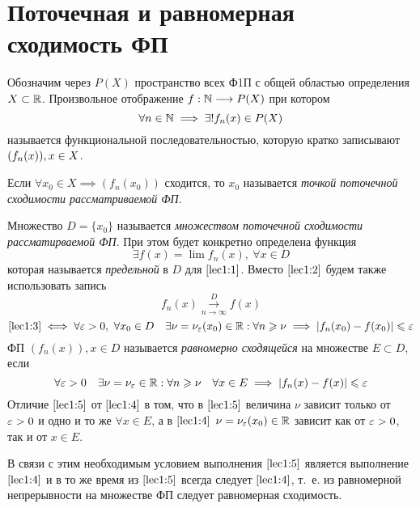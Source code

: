 \documentclass[../../main.tex]{subfiles}
\begin{document}
\section{Поточечная и равномерная сходимость ФП}
Обозначим через $P(X)$ пространство всех Ф1П 
с общей областью определения $X \subset \mathbb{R}$.
Произвольное отображение $f: \mathbb{N} \longrightarrow P(X)$ при котором 
\begin{equation}
\label{lec1:1}
\forall n \in \mathbb{N} \implies \exists! f_n(x) \in P(X)
\end{equation}
называется функциональной последовательностью, 
которую кратко записывают $(f_n(x)),\\ x\in X$.

Если $\forall x_0 \in X \implies (f_n(x_0))$ сходится, то $x_0$ называется
\emph{точкой поточечной сходимости рассматриваемой ФП}.

Множество $D = \{x_0\}$ называется \emph{множеством поточечной сходимости
рассматирваемой ФП}.
При этом будет конкретно определена функция 
\begin{equation}
\label{lec1:2}
\exists f(x) = \lim f_n(x),\ \forall x \in D
\end{equation}
которая называется \emph{предельной} в $D$ для $\eqref{lec1:1}$.
Вместо $\eqref{lec1:2}$ будем также использовать запись 
\begin{equation}
\label{lec1:3}
f_n(x) \overset{D}{\underset{n \to \infty}\longrightarrow} f(x)
\end{equation}
\begin{equation}
\label{lec1:4}
\eqref{lec1:3} \iff \forall \varepsilon > 0,\ \forall x_0 \in D \quad 
\exists \nu = \nu_\varepsilon(x_0) \in \mathbb{R} : \forall n \geqslant \nu \implies
|f_n(x_0) - f(x_0)| \leqslant \varepsilon
\end{equation}
ФП $(f_n(x)), x \in D$ называется \emph{равномерно сходящейся} 
на множестве $E \subset D$, если 
\begin{equation}
\label{lec1:5}
\forall \varepsilon > 0 \quad
\exists \nu = \nu_\varepsilon \in \mathbb{R} : 
\forall n \geqslant \nu \quad
\forall x \in E \implies 
|f_n(x) - f(x)| \leqslant \varepsilon
\end{equation}
Отличие $\eqref{lec1:5}$ от $\eqref{lec1:4}$ в том, что  в $\eqref{lec1:5}$
величина $\nu$ зависит только от $\varepsilon > 0$ и одно и то же $\forall x \in E$,
а в $\eqref{lec1:4}$ $\nu = \nu_\varepsilon(x_0) \in \mathbb{R}$ зависит как от $\varepsilon > 0$,
так и от $x \in E$.

В связи с этим необходимым условием выполнения $\eqref{lec1:5}$ 
является выполнение $\eqref{lec1:4}$ и в то же время из $\eqref{lec1:5}$
всегда следует $\eqref{lec1:4}$, т.~е. из равномерной непрерывности на 
множестве ФП следует равномерная сходимость.
\end{document}
